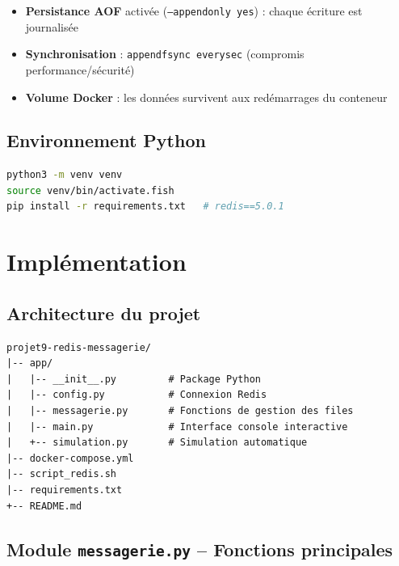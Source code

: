 \documentclass[12pt,a4paper]{article}
\begin{document}
\begin{itemize}
    \item \textbf{Persistance AOF} activ\'ee (\texttt{--appendonly yes}) : chaque \'ecriture est journalis\'ee
    \item \textbf{Synchronisation} : \texttt{appendfsync everysec} (compromis performance/s\'ecurit\'e)
    \item \textbf{Volume Docker} : les donn\'ees survivent aux red\'emarrages du conteneur
\end{itemize}

\subsection{Environnement Python}

\begin{lstlisting}[language=bash]
python3 -m venv venv
source venv/bin/activate.fish
pip install -r requirements.txt   # redis==5.0.1
\end{lstlisting}

\section{Impl\'ementation}

\subsection{Architecture du projet}

\begin{lstlisting}
projet9-redis-messagerie/
|-- app/
|   |-- __init__.py         # Package Python
|   |-- config.py           # Connexion Redis
|   |-- messagerie.py       # Fonctions de gestion des files
|   |-- main.py             # Interface console interactive
|   +-- simulation.py       # Simulation automatique
|-- docker-compose.yml
|-- script_redis.sh
|-- requirements.txt
+-- README.md
\end{lstlisting}

\subsection{Module \texttt{messagerie.py} -- Fonctions principales}
\end{document}

